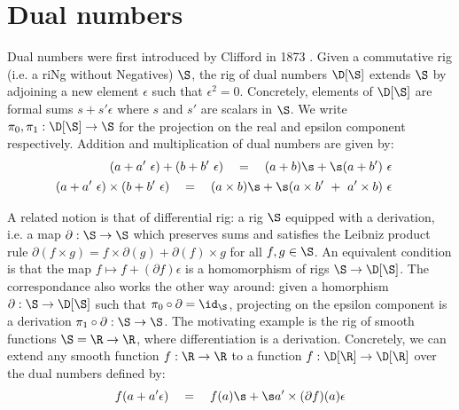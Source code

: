 
\section{Dual numbers}\label{1-dual-numbers}

Dual numbers were first introduced by Clifford in 1873 \cite{Clifford73}.
Given a commutative rig (i.e. a riNg without Negatives) $\S$, the rig of dual
numbers $\D[\S]$ extends $\S$ by adjoining a new element $\epsilon$ such that $\epsilon^2 = 0$.
Concretely, elements of $\D[\S]$ are formal sums $s + s' \epsilon$ where
$s$ and $s'$ are scalars in $\S$.
We write $\pi_0, \pi_1 : \D[\S] \to \S$
for the projection on the real and epsilon component respectively.
Addition and multiplication of dual numbers are given by:
\begin{align} \begin{split}\label{linearity}
(a + a' \ \epsilon ) + (b + b' \ \epsilon)
\quad &= \quad (a + b) \s + \s (a + b') \ \epsilon
\end{split}\\
\begin{split}\label{product-rule}
(a + a' \ \epsilon ) \times (b + b' \ \epsilon)
\quad &= \quad (a \times b) \s + \s (a \times b' \ + \ a' \times b) \ \epsilon
\end{split}
\end{align}

A related notion is that of differential rig: a rig $\S$ equipped with a
derivation, i.e. a map $\partial : \S \to \S$ which preserves sums and satisfies
the Leibniz product rule
$\partial(f \times g) = f \times \partial(g) + \partial(f) \times g$ for all
$f, g \in \S$.
An equivalent condition is that the map $f \mapsto f + (\partial f) \epsilon$
is a homomorphism of rigs $\S \to \D[\S]$. The correspondance also works the
other way around: given a homorphism $\partial : \S \to \D[\S]$ such that
$\pi_0 \circ \partial = \id_\S$, projecting on the epsilon component is a
derivation $\pi_1 \circ \partial : \S \to \S$. The motivating example is the rig
of smooth functions $\S = \R \to \R$, where differentiation is a derivation.
Concretely, we can extend any smooth function $f : \R \to \R$ to a
function $f : \D[\R] \to \D[\R]$ over the dual numbers defined by:
\begin{equation}\label{dual-numbers-eq}
f(a + a' \epsilon) \quad = \quad f(a) \s + \s a' \times (\partial f)(a) \epsilon
\end{equation}

